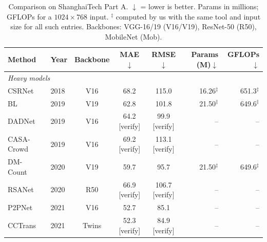 %
%
\begin{table}[t]
\centering
\caption{Comparison on ShanghaiTech Part A. $\downarrow$ = lower is better. Params in millions;
GFLOPs for a $1024\times768$ input. $^\ddagger$ computed by us with the same tool and input size for
all such entries. Backbones: VGG-16/19 (V16/V19), ResNet-50 (R50), MobileNet (Mob).}
\label{tab:sha_comparison}
\setlength{\tabcolsep}{4pt}
\begin{tabular}{llcccrr}
\toprule
Method & Year & Backbone & MAE$\downarrow$ & RMSE$\downarrow$ & Params (M)$\downarrow$ & GFLOPs$\downarrow$ \\
\midrule
\multicolumn{7}{l}{\textit{Heavy models}} \\
CSRNet~\cite{csrnet}        & 2018 & V16  & 68.2 & 115.0 & 16.26$^\ddagger$ & 651.3$^\ddagger$ \\
BL~\cite{bl}                & 2019 & V19  & 62.8 & 101.8 & 21.50$^\ddagger$ & 649.6$^\ddagger$ \\
DADNet~\cite{dadnet}        & 2019 & V16  & 64.2 [verify] & 99.9 [verify] & -- & -- \\ %
CASA-Crowd~\cite{casa}      & 2019 & V16  & 69.2 [verify] & 113.1 [verify] & -- & -- \\
DM-Count~\cite{dmcount}     & 2020 & V19  & 59.7 & 95.7  & 21.50$^\ddagger$ & 649.6$^\ddagger$ \\
RSANet~\cite{rsanet}        & 2020 & R50  & 66.9 [verify] & 106.7 [verify] & -- & -- \\
P2PNet~\cite{p2pnet}        & 2021 & V16  & 52.7 & 85.1  & -- & -- \\
CCTrans~\cite{cctrans}      & 2021 & Twins & 52.3 [verify] & 84.9 [verify] & -- & -- \\ %

\end{tabular}
\end{table}
